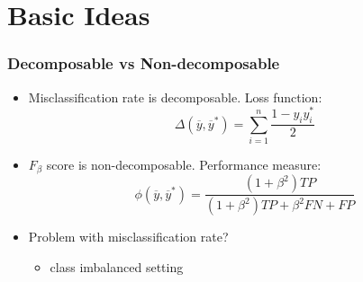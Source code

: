 \documentclass{beamer}
\begin{document}
\section{Basic Ideas} %


\begin{frame}
	\frametitle{Decomposable vs Non-decomposable}
	\begin{itemize}
		\item Misclassification rate is decomposable. Loss function:
		\begin{equation*}
		\Delta(\overline{y},\overline{y}^*) = \sum_{i=1}^{n} \frac{1-y_iy_i^*}{2}
		\end{equation*}
		\item $F_\beta$ score is non-decomposable. Performance measure:
		\begin{equation*}
		\phi(\overline{y},\overline{y}^*) = \frac{(1+\beta^2)TP}{(1+\beta^2)TP+\beta^2FN+FP}
		\end{equation*}
		\item Problem with misclassification rate?
		\begin{itemize}
			\item class imbalanced setting
		\end{itemize}
	\end{itemize}	
\end{frame}

\end{document}
